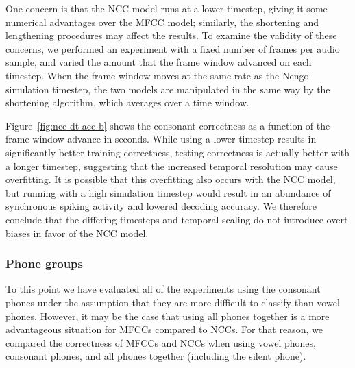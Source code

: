 One concern is that
the NCC model runs at a lower timestep,
giving it some numerical advantages
over the MFCC model;
similarly, the shortening and lengthening
procedures may affect the results.
To examine the validity of these concerns,
we performed an experiment
with a fixed number of frames
per audio sample,
and varied the amount that the frame window
advanced on each timestep.
When the frame window moves at the
same rate as the Nengo simulation timestep,
the two models are manipulated
in the same way by the
shortening algorithm,
which averages over a time window.


Figure~\ref{fig:ncc-dt-acc-b}
shows the consonant correctness
as a function of the
frame window advance in seconds.
While using a lower timestep results in
significantly better training correctness,
testing correctness is actually better
with a longer timestep,
suggesting that the increased temporal
resolution may cause overfitting.
It is possible that this overfitting
also occurs with the NCC model,
but running with a high simulation timestep
would result in an abundance of
synchronous spiking activity
and lowered decoding accuracy.
We therefore conclude that the
differing timesteps and temporal scaling
do not introduce overt biases
in favor of the NCC model.

\subsubsection{Phone groups}

To this point we have
evaluated all of the experiments using
the consonant phones
under the assumption that they are
more difficult to classify than vowel phones.
However, it may be the case that
using all phones together
is a more advantageous situation
for MFCCs compared to NCCs.
For that reason,
we compared the correctness
of MFCCs and NCCs when using
vowel phones, consonant phones,
and all phones together
(including the silent phone).


